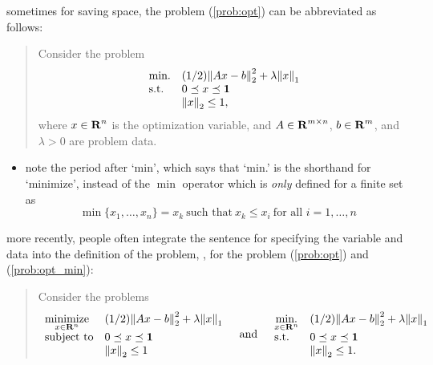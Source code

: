 \documentclass[usepdftitle=false]{beamer}
\begin{document}
\begin{frame}[t]
    \vspace*{1cm}

    sometimes for saving space, the problem (\ref{prob:opt}) can be abbreviated as follows:
    \begin{quote}
        Consider the problem
        \begin{equation}\label{prob:opt_min}
            \begin{array}{ll}
                \mbox{min.}   & (1/2){\lVert Ax-b \rVert}_2^2 + \lambda {\lVert x \rVert}_1 \\
                \mbox{s.t.} & 0 \preceq x \preceq \mathbf{1}\\
                & {\lVert x \rVert}_2 \leq 1,
            \end{array}
        \end{equation}
        where $x \in {\bf R{}}^n$ is the optimization variable, and $A \in {\bf R{}}^{m \times n}$, $b \in {\bf R{}}^m$, and $\lambda > 0$ are problem data.
    \end{quote}
    \begin{itemize}
        \item note the period after `min', which says that `min.' is the shorthand for `minimize', instead of the $\min$ operator which is \emph{only} defined for a finite set as
            \[
                \min \{x_1, \ldots, x_n\} = x_k \ \mbox{such that}\ x_k \leq x_i\ \mbox{for all $i = 1, \ldots, n$}
            \]
    \end{itemize}
    \vspace*{10pt}

    more recently, people often integrate the sentence for specifying the variable and data into the definition of the problem, \eg, for the problem (\ref{prob:opt}) and (\ref{prob:opt_min}):
    \begin{quote}
        Consider the problems
        \[
            \begin{array}{ll}
                \underset{x \in {\bf R{}}^n}{\mbox{minimize}}   & (1/2){\lVert Ax-b \rVert}_2^2 + \lambda {\lVert x \rVert}_1 \\
                \mbox{subject to} & 0 \preceq x \preceq \mathbf{1} \\
                & {\lVert x \rVert}_2 \leq 1
            \end{array}\quad \mbox{and}\quad
            \begin{array}{ll}
                \underset{x \in {\bf R{}}^n}{\mbox{min.}}   & (1/2){\lVert Ax-b \rVert}_2^2 + \lambda {\lVert x \rVert}_1 \\
                \mbox{s.t.} & 0 \preceq x \preceq \mathbf{1}\\
                & {\lVert x \rVert}_2 \leq 1.
            \end{array}
        \]
    \end{quote}
\end{frame}
\end{document}
